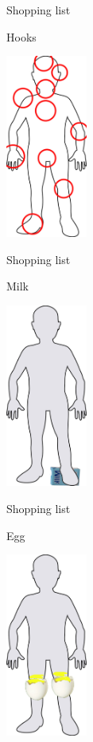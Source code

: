 \begin{frame}{Shopping list}
  \begin{block}{Hooks}
    \begin{center}
      \includegraphics[height=6cm]{img/body/body-areas.jpg}
    \end{center}
  \end{block}
\end{frame}

\begin{frame}{Shopping list}
  \begin{block}{Milk}
    \begin{center}
      \includegraphics[height=6cm]{img/body/body-01.jpg}
    \end{center}
  \end{block}
\end{frame}

\begin{frame}{Shopping list}
  \begin{block}{Egg}
    \begin{center}
      \includegraphics[height=6cm]{img/body/body-02.jpg}
    \end{center}
  \end{block}
\end{frame}

